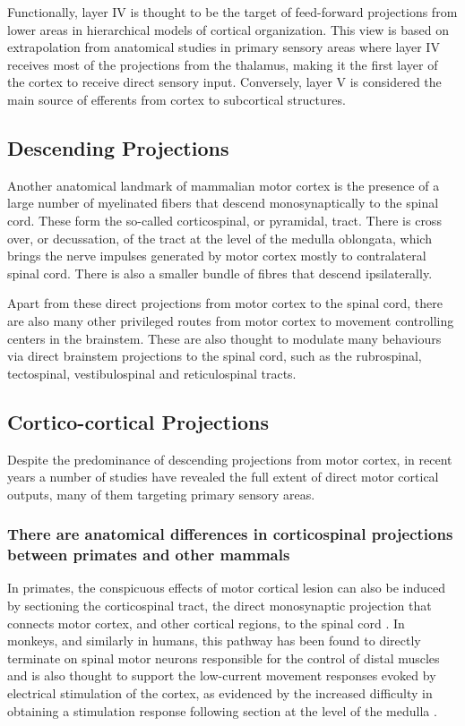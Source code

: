 Functionally, layer IV is thought to be the target of feed-forward projections from lower areas in hierarchical models of cortical organization. This view is based on extrapolation from anatomical studies in primary sensory areas where layer IV receives most of the projections from the thalamus, making it the first layer of the cortex to receive direct sensory input. Conversely, layer V is considered the main source of efferents from cortex to subcortical structures.

\subsection{Descending Projections}

Another anatomical landmark of mammalian motor cortex is the presence of a large number of myelinated fibers that descend monosynaptically to the spinal cord. These form the so-called corticospinal, or pyramidal, tract. There is cross over, or decussation, of the tract at the level of the medulla oblongata, which brings the nerve impulses generated by motor cortex mostly to contralateral spinal cord. There is also a smaller bundle of fibres that descend ipsilaterally.

Apart from these direct projections from motor cortex to the spinal cord, there are also many other privileged routes from motor cortex to movement controlling centers in the brainstem. These are also thought to modulate many behaviours via direct brainstem projections to the spinal cord, such as the rubrospinal, tectospinal, vestibulospinal and reticulospinal tracts.

\subsection{Cortico-cortical Projections}

Despite the predominance of descending projections from motor cortex, in recent years a number of studies have revealed the full extent of direct motor cortical outputs, many of them targeting primary sensory areas.

\subsubsection*{There are anatomical differences in corticospinal projections between primates and other mammals}

In primates, the conspicuous effects of motor cortical lesion can also be induced by sectioning the corticospinal tract, the direct monosynaptic projection that connects motor cortex, and other cortical regions, to the spinal cord \cite{Tower1940,Lawrence1968}. In monkeys, and similarly in humans, this pathway has been found to directly terminate on spinal motor neurons responsible for the control of distal muscles \cite{Leyton1917,Bernhard1954} and is also thought to support the low-current movement responses evoked by electrical stimulation of the cortex, as evidenced by the increased difficulty in obtaining a stimulation response following section at the level of the medulla \cite{Woolsey1972}.

